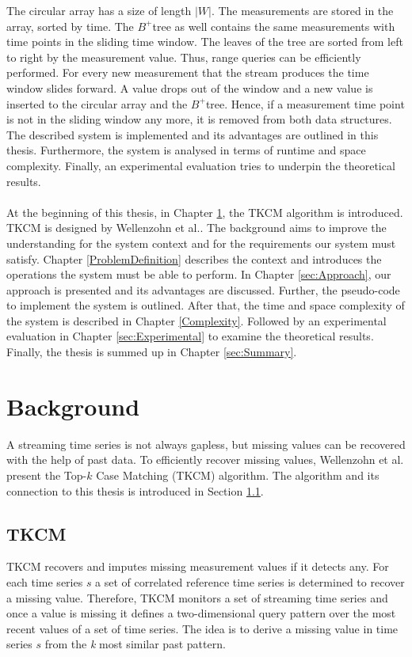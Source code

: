 \documentclass[abstracton,12pt,oneside]{scrreprt}
\begin{document}
The circular array has a size of length $|W|$. The measurements are stored in the array, sorted by time. The $B^+$tree as well contains the same measurements with time points in the sliding time window. The leaves of the tree are sorted from left to right by the measurement value. Thus, range queries can be efficiently performed. For every new measurement that the stream produces the time window slides forward. A value drops out of the window and a new value is inserted to the circular array and the $B^+$tree. Hence, if a measurement time point is not in the sliding window any more, it is removed from both data structures. \\
The described system is implemented and its advantages are outlined in this thesis. Furthermore, the system is analysed in terms of runtime and space complexity. Finally, an experimental evaluation tries to underpin the theoretical results.
\\ \\
At the beginning of this thesis, in Chapter \ref{background}, the TKCM algorithm is introduced. TKCM is designed by Wellenzohn et al.\cite{BScT}. The background aims to improve the understanding for the system context and for the requirements our system must satisfy. Chapter \ref{ProblemDefinition} describes the context and introduces the operations the system must be able to perform. In Chapter \ref{sec:Approach}, our approach is presented and its advantages are discussed. Further, the pseudo-code to implement the system is outlined. After that, the time and space complexity of the system is described in Chapter \ref{Complexity}. Followed by an experimental evaluation in Chapter \ref{sec:Experimental} to examine the theoretical results. Finally, the thesis is summed up in Chapter \ref{sec:Summary}.



\chapter{Background}
\label{background}
A streaming time series is not always gapless, but missing values can be recovered with the help of past data. To efficiently recover missing values, Wellenzohn et al.\cite{BScT} present the Top-$k$ Case Matching (TKCM) algorithm. The algorithm and its connection to this thesis is introduced in Section \ref{TKCM}.

\section{TKCM}
\label{TKCM}
TKCM recovers and imputes missing measurement values if it detects any. For each time series $s$ a set of correlated reference time series is determined to recover a missing value. Therefore, TKCM monitors a set of streaming time series and once a value is missing it defines a two-dimensional query pattern over the most recent values of a set of time series. The idea is to derive a missing value in time series $s$ from the \emph{k} most similar past pattern. 
\end{document}
